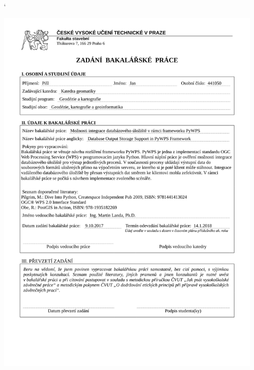 \documentclass[%
  12pt,         			%
  a4paper,      			%
  oneside,       			%
  pdftex,				    %
]{report}       			%
\begin{document}
\catcode`  %

\zahlavi

\renewcommand{\chaptermark}[1]{%
	\markboth{\MakeUppercase
	{%
	\thechapter.%
	\ #1}}{}}


\vytvortitulku

\stranka{}%
	{\includegraphics[scale=0.35]{./pictures/zadani.jpg}}%

\vytvorabstrakt

\vytvorprohlaseni
\end{document}
